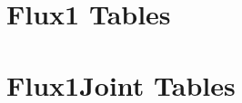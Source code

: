 \documentclass[landscape]{article}
\begin{document}
\section*{Flux1 Tables}


\clearpage
\section*{Flux1Joint Tables}

\end{document}
